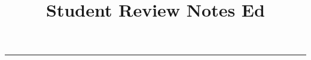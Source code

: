 \documentclass[12pt, twoside, exarticle]{article}
\title{\textbf{Student Review Notes Ed \docbuild}}
\begin{document}

\makeatletter
\hfil\parbox[t]{0.7\textwidth}{\centering\LARGE\bfseries\@title}\par
\kern0.5cm \hrule\kern0.5cm
\makeatother



\thispagestyle{empty}




\clearpage


\thispagestyle{empty}




\clearpage


\thispagestyle{empty}

\renewcommand{\contentsname}{Table of Contents}

\tableofcontents
\end{document}
